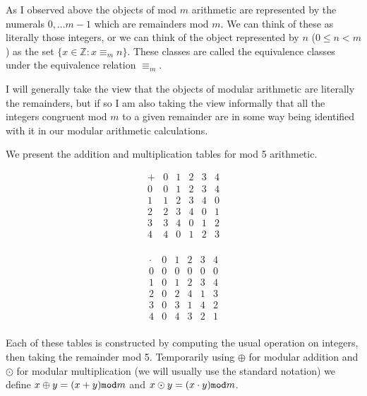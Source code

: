 \documentclass[12pt]{article}
\begin{document}
As I observed above the objects of mod $m$ arithmetic are represented by the numerals $0,\ldots m-1$ which are remainders mod $m$.  We can think of these as literally those integers, or we can think of the object represented by $n$ ($0\leq n < m$) as the set $\{x \in \mathbb Z:x \equiv_m n\}$.  These classes are called the equivalence classes under the equivalence relation $\equiv_m$.

I will generally take the view that the objects of modular arithmetic are literally the remainders, but if so I am also taking the view informally that all the integers congruent mod $m$ to a given remainder are in some way being identified with it in our modular arithmetic calculations.

We present the addition and multiplication tables for mod 5 arithmetic.

$$\begin{array}{c|ccccc}

+ & 0 & 1 & 2 & 3 & 4 \\ \hline
0& 0 & 1 & 2 & 3 & 4 \\

1&1 & 2 & 3 & 4& 0\\

2 & 2 & 3 & 4& 0 & 1\\

3 & 3 & 4& 0 & 1 & 2\\
4 & 4& 0 & 1 & 2& 3\\
\end{array}$$


$$\begin{array}{c|ccccc}

\cdot & 0 & 1 & 2 & 3 & 4 \\ \hline
0& 0 & 0 & 0 & 0 & 0 \\

1&0 & 1 & 2 & 3& 4\\

2 & 0 & 2 & 4& 1 & 3\\

3 & 0 & 3& 1 & 4 & 2\\
4 & 0& 4 & 3 & 2& 1\\
\end{array}$$

Each of these tables is constructed by computing the usual operation on integers, then taking the remainder mod 5.
Temporarily using $\oplus$ for modular addition and $\odot$ for modular multiplication (we will usually use the standard notation) we define $x \oplus y = (x+y){\tt mod} m$ and $x \odot y = (x\cdot y){\tt mod} m$.
\end{document}
